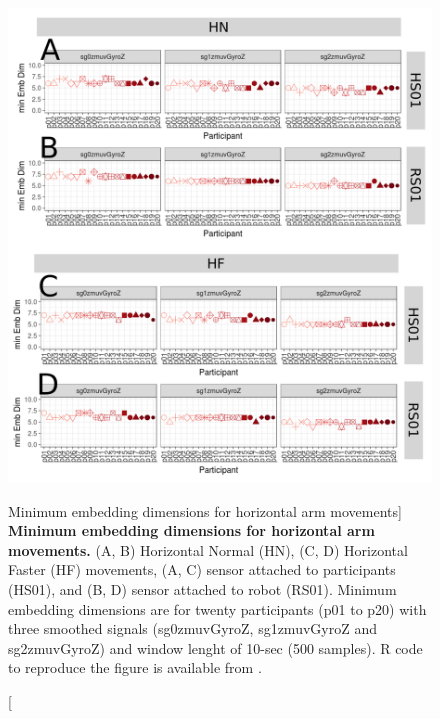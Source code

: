 \begin{figure}
\centering
\includegraphics[width=1.0\textwidth]{cao_aHw10}
	\caption
	[Minimum embedding dimensions for horizontal arm movements]{
	{\bf Minimum embedding dimensions for horizontal arm movements.} 
		(A, B) Horizontal Normal (HN), (C, D) Horizontal Faster (HF) 
		movements,
		(A, C) sensor attached to participants (HS01), and
		(B, D) sensor attached to robot (RS01).
		Minimum embedding dimensions are for twenty participants 
		(p01 to p20) with three smoothed signals 
		(sg0zmuvGyroZ, sg1zmuvGyroZ and sg2zmuvGyroZ)
		and window lenght of 10-sec (500 samples).
		R code to reproduce the figure is available 
		from \cite{xochicale2018}.
        }
    \label{fig:caoH}
\end{figure}

